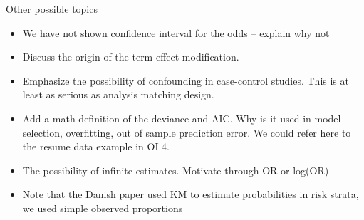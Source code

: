 Other possible topics

\begin{itemize}

\item We have not shown confidence interval for the odds -- explain why not

\item Discuss the origin of the term effect modification.

\item Emphasize the possibility of confounding in case-control studies.  This is at least as serious as analysis matching design.

\item Add a math definition of the deviance and AIC.  Why is it used in model selection, overfitting, out of sample prediction error.  We could refer here to the resume data example in OI 4.

\item The possibility of infinite estimates.  Motivate through OR or log(OR)

\item Note that the Danish paper used KM to estimate probabilities in risk strata, we used simple observed proportions


\end{itemize}




